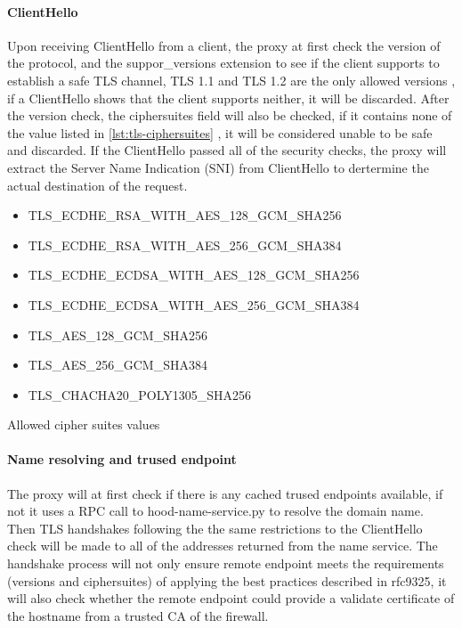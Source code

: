 \documentclass[mscthesis]{usiinfthesis}
\begin{document}
\paragraph{ClientHello}
Upon receiving ClientHello from a client, the proxy at first check the version of the protocol, and the suppor\_versions extension to see if the client supports to establish a safe TLS channel, TLS 1.1 and TLS 1.2 are the only allowed versions \citep{rfc:bstprc}, if a ClientHello shows that the client supports neither, it will be discarded. After the version check, the ciphersuites field will also be checked, if it contains none of the value listed in \ref{lst:tls-ciphersuites} \citep{rfc:bstprc}, it will be considered unable to be safe and discarded. If the ClientHello passed all of the security checks, the proxy will extract the Server Name Indication (SNI) from ClientHello to dertermine the actual destination of the request.

\begin{table}[H]
  \begin{itemize}
    \item TLS\_ECDHE\_RSA\_WITH\_AES\_128\_GCM\_SHA256
    \item TLS\_ECDHE\_RSA\_WITH\_AES\_256\_GCM\_SHA384
    \item TLS\_ECDHE\_ECDSA\_WITH\_AES\_128\_GCM\_SHA256
    \item TLS\_ECDHE\_ECDSA\_WITH\_AES\_256\_GCM\_SHA384
    \item TLS\_AES\_128\_GCM\_SHA256
    \item TLS\_AES\_256\_GCM\_SHA384
    \item TLS\_CHACHA20\_POLY1305\_SHA256
  \end{itemize}
  \caption{Allowed cipher suites values}
  \label{lst:tls-ciphersuites}
\end{table}

\paragraph{Name resolving and trused endpoint}
The proxy will at first check if there is any cached trused endpoints available, if not it uses a RPC call to hood-name-service.py to resolve the domain name. Then TLS handshakes following the the same restrictions to the ClientHello check will be made to all of the addresses returned from the name service. The handshake process will not only ensure remote endpoint meets the requirements (versions and ciphersuites) of applying the best practices described in rfc9325, it will also check whether the remote endpoint could provide a validate certificate of the hostname from a trusted CA of the firewall.
\end{document}
